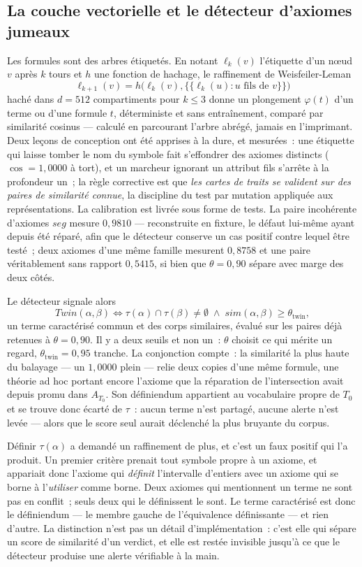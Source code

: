 \documentclass[11pt]{article}
\theoremstyle{remark}\newtheorem{example}{Exemple}
\begin{document}
\subsection{La couche vectorielle et le détecteur d'axiomes jumeaux}
Les formules sont des arbres étiquetés. En notant $\ell_k(v)$ l'étiquette d'un nœud
$v$ après $k$ tours et $h$ une fonction de hachage, le raffinement de
Weisfeiler-Leman
\[ \ell_{k+1}(v) = h\bigl(\ell_k(v), \{\!\!\{\ell_k(u) : u \text{ fils de } v\}\!\!\}\bigr) \]
haché dans $d{=}512$ compartiments pour $k \le 3$ donne un plongement $\varphi(t)$
d'un terme ou d'une formule $t$, déterministe et sans entraînement, comparé par
similarité cosinus --- calculé en
parcourant l'arbre abrégé, jamais en l'imprimant. Deux leçons de conception ont été
apprises à la dure, et mesurées~: une étiquette qui laisse tomber le nom du symbole
fait s'effondrer des axiomes distincts ($\cos = 1{,}0000$ à tort), et un marcheur
ignorant un attribut fils s'arrête à la profondeur un~; la règle corrective est que
\emph{les cartes de traits se valident sur des paires de similarité connue}, la
discipline du test par mutation appliquée aux représentations. La calibration est livrée
sous forme de tests. La paire incohérente d'axiomes $\mathit{seg}$ mesure $0{,}9810$
--- reconstruite en fixture, le défaut lui-même ayant depuis été réparé, afin que le
détecteur conserve un cas positif contre lequel être testé~; deux axiomes d'une même
famille mesurent $0{,}8758$ et une paire véritablement sans rapport $0{,}5415$, si bien
que $\theta = 0{,}90$ sépare avec marge des deux côtés.

Le détecteur signale alors
\[ \mathit{Twin}(\alpha,\beta) \iff \tau(\alpha) \cap \tau(\beta) \neq \emptyset
   \;\wedge\; \mathit{sim}(\alpha,\beta) \geq \theta_{\mathrm{twin}} , \]
un terme caractérisé commun et des corps similaires, évalué sur les paires déjà
retenues à $\theta = 0{,}90$. Il y a deux seuils et non un~: $\theta$ choisit ce qui
mérite un regard, $\theta_{\mathrm{twin}} = 0{,}95$ tranche. La conjonction compte~:
la similarité la plus haute du balayage --- un $1{,}0000$ plein --- relie deux copies
d'une même formule, une théorie ad hoc portant encore l'axiome que la réparation de
l'intersection avait depuis promu dans $A_{T_0}$. Son définiendum appartient au
vocabulaire propre de $T_0$ et se trouve donc écarté de $\tau$~: aucun terme n'est
partagé, aucune alerte n'est levée --- alors que le score seul aurait déclenché la
plus bruyante du corpus.

Définir $\tau(\alpha)$ a demandé un raffinement de plus, et c'est un faux positif qui
l'a produit. Un premier critère prenait tout symbole propre à un axiome, et appariait
donc l'axiome qui \emph{définit} l'intervalle d'entiers avec un axiome qui se borne à
l'\emph{utiliser} comme borne. Deux axiomes qui mentionnent un terme ne sont pas en
conflit~; seuls deux qui le définissent le sont. Le terme caractérisé est donc le
définiendum --- le membre gauche de l'équivalence définissante --- et rien d'autre. La
distinction n'est pas un détail d'implémentation~: c'est elle qui sépare un score de
similarité d'un verdict, et elle est restée invisible jusqu'à ce que le détecteur
produise une alerte vérifiable à la main.
\end{document}

